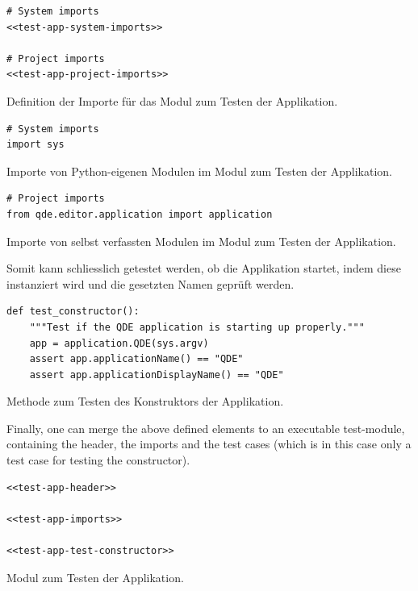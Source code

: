 \documentclass[10pt, openright, notitlepage]{scrreprt}
\begin{document}
\begin{listing}[H]
\begin{verbatim}
# System imports
<<test-app-system-imports>>

# Project imports
<<test-app-project-imports>>
\end{verbatim}
\caption{\label{test-app-imports}
Definition der Importe für das Modul zum Testen der Applikation.}
\end{listing}

\begin{listing}[H]
\begin{verbatim}
# System imports
import sys
\end{verbatim}
\caption{Importe von Python-eigenen Modulen im Modul zum Testen der Applikation.}
\end{listing}

\begin{listing}[H]
\begin{verbatim}
# Project imports
from qde.editor.application import application
\end{verbatim}
\caption{\label{test-app-project-imports}
Importe von selbst verfassten Modulen im Modul zum Testen der Applikation.}
\end{listing}

Somit kann schliesslich getestet werden, ob die Applikation startet, indem diese
instanziert wird und die gesetzten Namen geprüft werden.

\begin{listing}[H]
\begin{verbatim}
def test_constructor():
    """Test if the QDE application is starting up properly."""
    app = application.QDE(sys.argv)
    assert app.applicationName() == "QDE"
    assert app.applicationDisplayName() == "QDE"
\end{verbatim}
\caption{\label{test-app-test-constructor}
Methode zum Testen des Konstruktors der Applikation.}
\end{listing}

Finally, one can merge the above defined elements to an executable test-module,
containing the header, the imports and the test cases (which is in this case
only a test case for testing the constructor).

\begin{listing}[H]
\begin{verbatim}
<<test-app-header>>

<<test-app-imports>>

<<test-app-test-constructor>>
\end{verbatim}
\caption{Modul zum Testen der Applikation.}
\end{listing}
\end{document}
